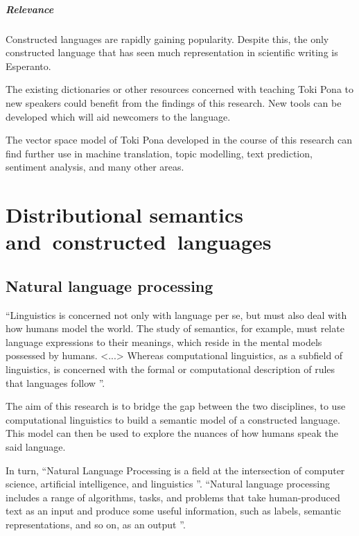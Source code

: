 \documentclass[14pt, a4paper]{extreport}
\begin{document}
\paragraph{Relevance}
Constructed languages are rapidly gaining popularity. Despite this, the only constructed language that has seen much representation in scientific writing is Esperanto.

The existing dictionaries or other resources concerned with teaching Toki Pona to new speakers could benefit from the findings of this research. New tools can be developed which will aid newcomers to the language.

The vector space model of Toki Pona developed in the course of this research can find further use in machine translation, topic modelling, text prediction, sentiment analysis, and many other areas.


\chapter{Distributional semantics and~constructed~languages}
  \section{Natural language processing}
``Linguistics is concerned not only with language per se, but must also deal with how humans model the world. The study of semantics, for example, must relate language expressions to their meanings, which reside in the mental models possessed by humans. <...> Whereas computational linguistics, as a subfield of linguistics, is concerned with the formal or computational description of rules that languages follow \parencite{nlpandcl}''.

The aim of this research is to bridge the gap between the two disciplines, to use computational linguistics to build a semantic model of a constructed language. This model can then be used to explore the nuances of how humans speak the said language.

In turn, ``Natural Language Processing is a field at the intersection of computer science, artificial intelligence, and linguistics \parencite[7]{practicalnlp}''. ``Natural language processing includes a range of algorithms, tasks, and problems that take human-produced text as an input and produce some useful information, such as labels, semantic representations, and so on, as an output \parencite[4]{realworldnlp}''.
\end{document}
